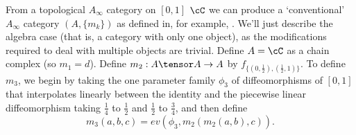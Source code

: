 
From a topological $A_\infty$ category on $[0,1]$ $\cC$ we can produce a `conventional' $A_\infty$ category $(A, \{m_k\})$ as defined in, for example, \cite{MR1854636}. We'll just describe the algebra case (that is, a category with only one object), as the modifications required to deal with multiple objects are trivial. Define $A = \cC$ as a chain complex (so $m_1 = d$). Define $m_2 : A\tensor A \to A$ by $f_{\{(0,\frac{1}{2}),(\frac{1}{2},1)\}}$. To define $m_3$, we begin by taking the one parameter family $\phi_3$ of diffeomorphisms of $[0,1]$ that interpolates linearly between the identity and the piecewise linear diffeomorphism taking $\frac{1}{4}$ to $\frac{1}{2}$ and $\frac{1}{2}$ to $\frac{3}{4}$, and then define
\begin{equation*}
m_3(a,b,c) = ev(\phi_3, m_2(m_2(a,b), c)).
\end{equation*}

